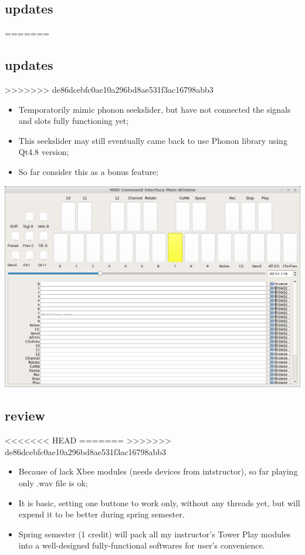 \documentclass[9pt,b5paper]{article}
\begin{document}
\subsection{updates}
\label{sec-8-1}
=======
\label{sec-7}
\subsection{updates}
\label{sec-7-1}
>>>>>>> de86dcebfc0ae10a296bd8ae531f3ac16798abb3
\begin{itemize}
\item Temporatorily mimic phonon seekslider, but have not connected the signals and slots fully functioning yet;
\item This seekslider may still eventually came back to use Phonon library using Qt4.8 version;
\item So far consider this as a bonus feature;
\end{itemize}
\includegraphics[width=.9\linewidth]{./pic/Screenshot_from_2014-12-11_17:34:24.png}
\subsection{review}
<<<<<<< HEAD
\label{sec-8-2}
=======
\label{sec-7-2}
>>>>>>> de86dcebfc0ae10a296bd8ae531f3ac16798abb3
\begin{itemize}
\item Because of lack Xbee modules (needs devices from intstructor), so far playing only .wav file is ok;
\item It is basic, setting one buttone to work only, without any threads yet, but will expend it to be better during spring semester.
\item Spring semester (1 credit) will pack all my instructor's Tower Play modules into a well-designed fully-functional softwares for user's convenience.
\end{itemize}
\end{document}
